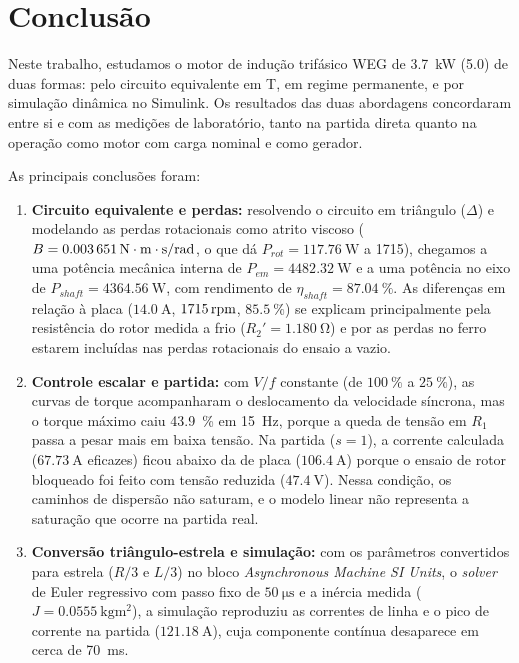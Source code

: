 \chapter*{Conclusão}
\label{cap:conclusao}

Neste trabalho, estudamos o motor de indução trifásico WEG de \SI{3,7}{\kilo\watt} (\SI{5,0}{\cv}) de duas formas: pelo circuito equivalente em T, em regime permanente, e por simulação dinâmica no Simulink. Os resultados das duas abordagens concordaram entre si e com as medições de laboratório, tanto na partida direta quanto na operação como motor com carga nominal e como gerador.

As principais conclusões foram:
\begin{enumerate}
    \item \textbf{Circuito equivalente e perdas:} resolvendo o circuito em triângulo ($\Delta$) e modelando as perdas rotacionais como atrito viscoso ($B = \SI{0,003651}{\mathrm{N\cdot m}\cdot\second/\radian}$, o que dá $P_{rot} = \SI{117,76}{\watt}$ a \SI{1715}{\RPM}), chegamos a uma potência mecânica interna de $P_{em} = \SI{4482,32}{\watt}$ e a uma potência no eixo de $P_{shaft} = \SI{4364,56}{\watt}$, com rendimento de $\eta_{shaft} = \SI{87,04}{\percent}$. As diferenças em relação à placa ($\SI{14,0}{\ampere}$, $\SI{1715}{\mathrm{rpm}}$, $\SI{85,5}{\percent}$) se explicam principalmente pela resistência do rotor medida a frio ($R_2' = \SI{1,180}{\ohm}$) e por as perdas no ferro estarem incluídas nas perdas rotacionais do ensaio a vazio.
    \item \textbf{Controle escalar e partida:} com $V/f$ constante (de $\SI{100}{\percent}$ a $\SI{25}{\percent}$), as curvas de torque acompanharam o deslocamento da velocidade síncrona, mas o torque máximo caiu \SI{43,9}{\percent} em \SI{15}{\hertz}, porque a queda de tensão em $R_1$ passa a pesar mais em baixa tensão. Na partida ($s = 1$), a corrente calculada ($\SI{67,73}{\ampere}$ eficazes) ficou abaixo da de placa ($\SI{106,4}{\ampere}$) porque o ensaio de rotor bloqueado foi feito com tensão reduzida ($\SI{47,4}{\volt}$). Nessa condição, os caminhos de dispersão não saturam, e o modelo linear não representa a saturação que ocorre na partida real.
    \item \textbf{Conversão triângulo-estrela e simulação:} com os parâmetros convertidos para estrela ($R/3$ e $L/3$) no bloco \textit{Asynchronous Machine SI Units}, o \textit{solver} de Euler regressivo com passo fixo de $\SI{50}{\micro\second}$ e a inércia medida ($J = \SI{0,0555}{\kilogram\meter\squared}$), a simulação reproduziu as correntes de linha e o pico de corrente na partida ($\SI{121,18}{\ampere}$), cuja componente contínua desaparece em cerca de \SI{70}{\milli\second}.

\end{enumerate}
